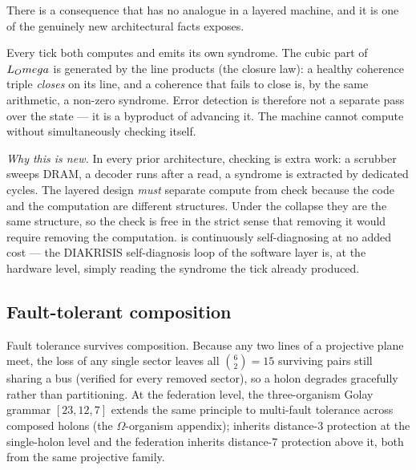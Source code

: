 There is a consequence that has no analogue in a layered machine, and it is
one of the genuinely new architectural facts \TALOS{} exposes.

\begin{principle}\label{prin:selfdiag}
Every tick both computes and emits its own syndrome. The cubic part of
$L_Omega$ is generated by the line products (the closure law): a healthy
coherence triple \emph{closes} on its line, and a coherence that fails to
close is, by the same arithmetic, a non-zero syndrome. Error detection is
therefore not a separate pass over the state --- it is a byproduct of
advancing it. The machine cannot compute without simultaneously checking
itself.
\end{principle}

\noindent\emph{Why this is new.} In every prior architecture, checking is
extra work: a scrubber sweeps DRAM, a decoder runs after a read, a syndrome
is extracted by dedicated cycles. The layered design \emph{must} separate
compute from check because the code and the computation are different
structures. Under the collapse they are the same structure, so the check is
free in the strict sense that removing it would require removing the
computation. \TALOS{} is continuously self-diagnosing at no added cost ---
the DIAKRISIS self-diagnosis loop of the \SYNARC{} software layer is, at the
hardware level, simply reading the syndrome the tick already produced.

\subsection{Fault-tolerant composition}

Fault tolerance survives composition. Because any two lines of a projective
plane meet, the loss of any single sector leaves all $\binom{6}{2}=15$
surviving pairs still sharing a bus (verified for every removed sector), so a
holon degrades gracefully rather than partitioning. At the federation level,
the three-organism Golay grammar $[23,12,7]$ extends the same principle to
multi-fault tolerance across composed holons (the \SYNARC{} $\Omega$-organism
appendix); \TALOS{} inherits distance-3 protection at the single-holon level
and the federation inherits distance-7 protection above it, both from the
same projective family.

